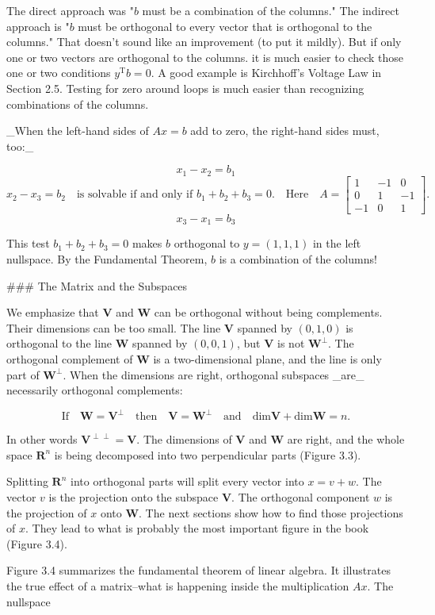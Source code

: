 The direct approach was "\(b\) must be a combination of the columns." The indirect approach is "\(b\) must be orthogonal to every vector that is orthogonal to the columns." That doesn't sound like an improvement (to put it mildly). But if only one or two vectors are orthogonal to the columns. it is much easier to check those one or two conditions \(y^{\mathrm{T}}b=0\). A good example is Kirchhoff's Voltage Law in Section 2.5. Testing for zero around loops is much easier than recognizing combinations of the columns.

_When the left-hand sides of \(Ax=b\) add to zero, the right-hand sides must, too:_

\[x_{1}-x_{2} =b_{1}\] \[x_{2}-x_{3} =b_{2}\quad\text{is solvable if and only if }b_{1}+b_{2}+b_{3}=0. \quad\text{Here}\quad A=\begin{bmatrix}1&-1&0\\ 0&1&-1\\ -1&0&1\end{bmatrix}.\] \[x_{3}-x_{1} =b_{3}\]

This test \(b_{1}+b_{2}+b_{3}=0\) makes \(b\) orthogonal to \(y=(1,1,1)\) in the left nullspace. By the Fundamental Theorem, \(b\) is a combination of the columns!

### The Matrix and the Subspaces

We emphasize that \(\mathbf{V}\) and \(\mathbf{W}\) can be orthogonal without being complements. Their dimensions can be too small. The line \(\mathbf{V}\) spanned by \((0,1,0)\) is orthogonal to the line \(\mathbf{W}\) spanned by \((0,0,1)\), but \(\mathbf{V}\) is not \(\mathbf{W}^{\perp}\). The orthogonal complement of \(\mathbf{W}\) is a two-dimensional plane, and the line is only part of \(\mathbf{W}^{\perp}\). When the dimensions are right, orthogonal subspaces _are_ necessarily orthogonal complements:

\[\text{If}\quad\mathbf{W}=\mathbf{V}^{\perp}\quad\text{then}\quad\mathbf{V}= \mathbf{W}^{\perp}\quad\text{and}\quad\text{dim}\mathbf{V}+\text{dim}\mathbf{ W}=n.\]

In other words \(\mathbf{V}^{\perp\perp}=\mathbf{V}\). The dimensions of \(\mathbf{V}\) and \(\mathbf{W}\) are right, and the whole space \(\mathbf{R}^{n}\) is being decomposed into two perpendicular parts (Figure 3.3).

Splitting \(\mathbf{R}^{n}\) into orthogonal parts will split every vector into \(x=v+w\). The vector \(v\) is the projection onto the subspace \(\mathbf{V}\). The orthogonal component \(w\) is the projection of \(x\) onto \(\mathbf{W}\). The next sections show how to find those projections of \(x\). They lead to what is probably the most important figure in the book (Figure 3.4).

Figure 3.4 summarizes the fundamental theorem of linear algebra. It illustrates the true effect of a matrix--what is happening inside the multiplication \(Ax\). The nullspace

